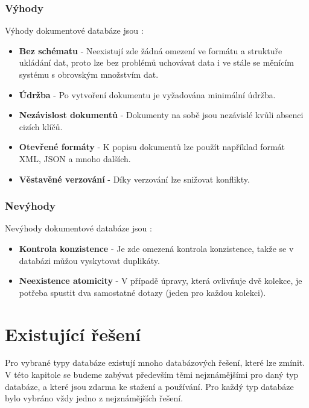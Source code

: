 \subsubsection{Výhody}
Výhody dokumentové databáze jsou \cite{advantages_document}:
\begin{itemize}
\item \textbf{Bez schématu} - Neexistují zde žádná omezení ve formátu a struktuře ukládání dat, proto lze bez problémů uchovávat data i ve stále se měnícím systému s obrovským množstvím dat.
\item \textbf{Údržba} - Po vytvoření dokumentu je vyžadována minimální údržba.
\item \textbf{Nezávislost dokumentů} - Dokumenty na sobě jsou nezávislé kvůli absenci cizích klíčů.
\item \textbf{Otevřené formáty} - K popisu dokumentů lze použít například formát \gls{XML}, \gls{JSON} a mnoho dalších.
\item \textbf{Věstavěné verzování} - Díky verzování lze snižovat konflikty.
\end{itemize}

\subsubsection{Nevýhody}
Nevýhody dokumentové databáze jsou \cite{advantages_document}:
\begin{itemize}
\item \textbf{Kontrola konzistence} - Je zde omezená kontrola konzistence, takže se v databázi můžou vyskytovat duplikáty.
\item \textbf{Neexistence atomicity} - V případě úpravy, která ovlivňuje dvě kolekce, je potřeba spustit dva samostatné dotazy (jeden pro každou kolekci).
\end{itemize}

\section{Existující řešení}
Pro vybrané typy databáze existují mnoho databázových řešení, které lze zmínit. V této kapitole se budeme zabývat především těmi nejznámějšími pro daný typ databáze, a které jsou zdarma ke stažení a používání. Pro každý typ databáze bylo vybráno vždy jedno z nejznámějších řešení.
